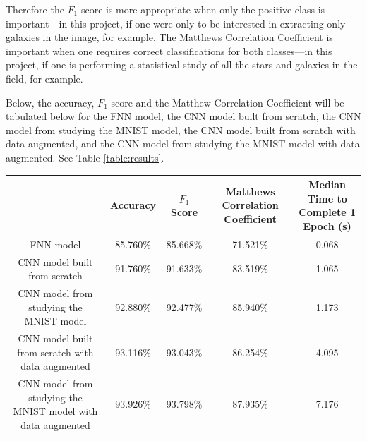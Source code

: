 \documentclass[a4paper,fleqn,usenatbib]{mnras}
\begin{document}
Therefore the $F_1$ score is more appropriate when only the positive class is important---in this project, if one were only to be interested in extracting only galaxies in the image, for example. The Matthews Correlation Coefficient is important when one requires correct classifications for both classes---in this project, if one is performing a statistical study of all the stars and galaxies in the field, for example. 

Below, the accuracy, $F_1$ score and the Matthew Correlation Coefficient will be tabulated below for the FNN model, the CNN model built from scratch, the CNN model from studying the MNIST model, the CNN model built from scratch with data augmented, and the CNN model from studying the MNIST model with data augmented. See Table \ref{table:results}.


\begin{table}
 \begin{tabular}{||c|c c c |c||} 
 \hline
  & Accuracy & $F_1$ Score & Matthews Correlation Coefficient & \makecell{Median Time to \\Complete 1 Epoch (s)}\\ [0.5ex] 
 \hline\hline
 FNN model & 85.760\% & 85.668\% & 71.521\%  & 0.068\\ 
 \hline
 CNN model built from scratch & 91.760\% & 91.633\% & 83.519\%  & 1.065\\
 \hline
 CNN model from studying the MNIST model & 92.880\% & 92.477\% & 85.940\% & 1.173 \\
 \hline
  CNN model built from scratch with data augmented & 93.116\% & 93.043\% & 86.254\% & 4.095\\
 \hline
 CNN model from studying the MNIST model with data augmented & 93.926\% & 93.798\% & 87.935\% & 7.176\\
 \hline
\end{tabular}

\end{table}
\end{document}
